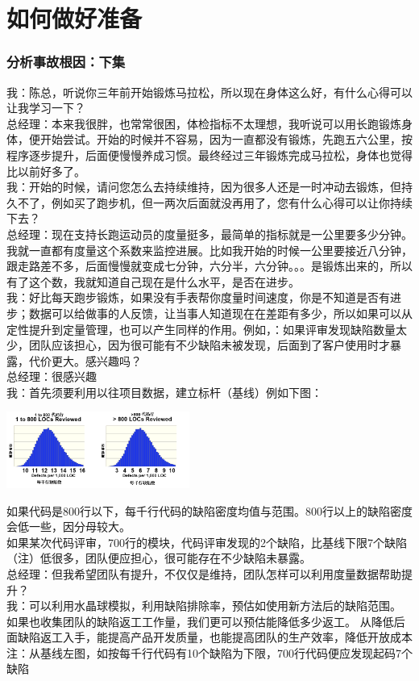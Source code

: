 \chapter{如何做好准备} %

\hypertarget{ux5206ux6790ux4e8bux6545ux6839ux56e0ux4e0bux96c6}{%
\subsection{分析事故根因：下集}\label{ux5206ux6790ux4e8bux6545ux6839ux56e0ux4e0bux96c6}}

我：陈总，听说你三年前开始锻炼马拉松，所以现在身体这么好，有什么心得可以让我学习一下？\\
总经理：本来我很胖，也常常很困，体检指标不太理想，我听说可以用长跑锻炼身体，便开始尝试。开始的时候并不容易，因为一直都没有锻炼，先跑五六公里，按程序逐步提升，后面便慢慢养成习惯。最终经过三年锻炼完成马拉松，身体也觉得比以前好多了。\\
我：开始的时候，请问您怎么去持续维持，因为很多人还是一时冲动去锻炼，但持久不了，例如买了跑步机，但一两次后面就没再用了，您有什么心得可以让你持续下去？\\
总经理：现在支持长跑运动员的度量挺多，最简单的指标就是一公里要多少分钟。我就一直都有度量这个系数来监控进展。比如我开始的时候一公里要接近八分钟，跟走路差不多，后面慢慢就变成七分钟，六分半，六分钟。。。是锻炼出来的，所以有了这个数，我就知道自己现在是什么水平，是否在进步。\\
我：好比每天跑步锻炼，如果没有手表帮你度量时间速度，你是不知道是否有进步；数据可以给做事的人反馈，让当事人知道现在在差距有多少，所以如果可以从定性提升到定量管理，也可以产生同样的作用。例如，：如果评审发现缺陷数量太少，团队应该担心，因为很可能有不少缺陷未被发现，后面到了客户使用时才暴露，代价更大。感兴趣吗？\\
总经理：很感兴趣\\
我：首先须要利用以往项目数据，建立标杆（基线）例如下图：


\includegraphics[width=6cm]{微信截图_20230605130227.png}

如果代码是800行以下，每千行代码的缺陷密度均值与范围。800行以上的缺陷密度会低一些，因分母较大。\\
如果某次代码评审，700行的模块，代码评审发现的2个缺陷，比基线下限7个缺陷（注）低很多，团队便应担心，很可能存在不少缺陷未暴露。\\
总经理：但我希望团队有提升，不仅仅是维持，团队怎样可以利用度量数据帮助提升？\\
我：可以利用水晶球模拟，利用缺陷排除率，预估如使用新方法后的缺陷范围。\\
如果也收集团队的缺陷返工工作量，我们更可以预估能降低多少返工。
从降低后面缺陷返工入手，能提高产品开发质量，也能提高团队的生产效率，降低开放成本\\
注：从基线左图，如按每千行代码有10个缺陷为下限，700行代码便应发现起码7个缺陷

